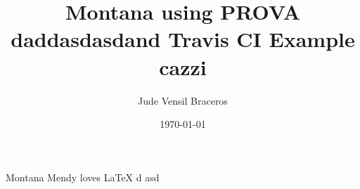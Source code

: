 \documentclass{article}
\title{Montana using PROVA daddasdasdand Travis CI Example cazzi}
\author{Jude Vensil Braceros}
\date{\today}
\begin{document}
\maketitle

Montana Mendy loves LaTeX d asd
\end{document}

